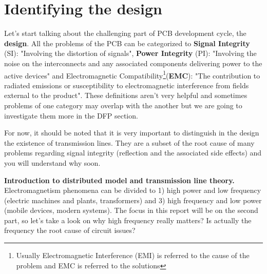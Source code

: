 \documentclass[final]{cubedoc}
\begin{document}
	\section{Identifying the design}
	
	
	Let's start talking about the challenging part of PCB development cycle, the \textbf{design}. All the problems of the PCB can be categorized to \textbf{Signal Integrity} (SI): "Involving the distortion of signals", \textbf{Power Integrity} (PI): "Involving the noise on the interconnects and any associated components delivering power to the active devices" and Electromagnetic Compatibility\footnote{Usually Electromagnetic Interference (EMI) is referred to the cause of the problem and EMC is referred to the solutions}(\textbf{EMC}): "The contribution to radiated emissions or susceptibility to electromagnetic interference from fields external to the product". These definitions aren't very helpful and sometimes problems of one category may overlap with the another but we are going to investigate them more in the DFP section.
	
	
	For now, it should be noted that it is very important to distinguish in the design the existence of transmission lines. They are a subset of the root cause of many problems regarding signal integrity (reflection and the associated side effects) and you will understand why soon.
	
	\textbf{Introduction to distributed model and transmission line theory. }
	Electromagnetism phenomena can be divided to 1) high power and low frequency (electric machines and plants, transformers) and 3) high frequency and low power (mobile devices, modern systems). The focus in this report will be on the second part, so let's take a look on why high frequency really matters? Is actually the frequency the root cause of circuit issues?
	
\end{document}
